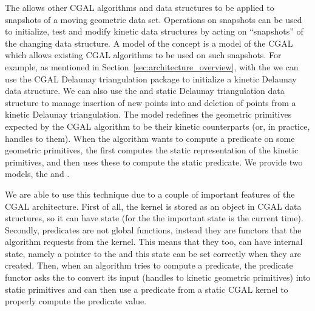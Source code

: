 The  allows other CGAL algorithms and data
structures to be applied to snapshots of a moving geometric data
set. Operations on snapshots can be used to initialize, test and
modify kinetic data structures by acting on ``snapshots'' of the
changing data structure. A model of the 
concept is a model of the CGAL  which allows existing CGAL
algorithms to be used on such snapshots.  For example, as mentioned in
Section~\ref{sec:architecture_overview}, with the
 we can use the CGAL Delaunay triangulation
package to initialize a kinetic Delaunay data structure. We can also
use the  and static Delaunay triangulation
data structure to manage insertion of new points into and deletion of
points from a kinetic Delaunay triangulation. The
 model redefines the geometric primitives
expected by the CGAL algorithm to be their kinetic counterparts (or,
in practice, handles to them). When the algorithm wants to compute a
predicate on some geometric primitives, the 
first computes the static representation of the kinetic primitives,
and then uses these to compute the static predicate. We provide two
models, the
 and
.

We are able to use this technique due to a couple of important
features of the CGAL architecture. First of all, the kernel is stored
as an object in CGAL data structures, so it can have state (for the
 the important state is the current
time). Secondly, predicates are not global functions, instead they are
functors that the algorithm requests from the kernel. This means that
they too, can have internal state, namely a pointer to the
 and this state can be set correctly when
they are created. Then, when an algorithm tries to compute a
predicate, the predicate functor asks the  to
convert its input (handles to kinetic geometric primitives) into
static primitives and can then use a predicate from a static CGAL
kernel to properly compute the predicate value.


